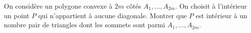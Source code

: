 On considère un polygone convexe à $2m$ côtés $A_1, \ldots, A_{2m}$. On choisit à l'intérieur un point $P$ qui n'appartient à aucune diagonale. Montrer que $P$ est intérieur à un nombre pair de triangles dont les sommets sont parmi $A_1, \ldots, A_{2m}$.

